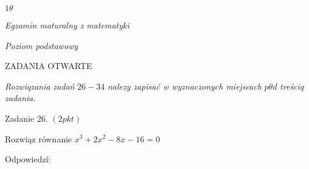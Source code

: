 \documentclass[a4paper,12pt]{article}
\begin{document}
$ 1\theta$

{\it Egzamin maturalny z matematyki}

{\it Poziom podstawowy}

ZADANIA OTWARTE

{\it Rozwiqzania zadań} $26-34$ {\it nalezy zapisać w wyznaczonych miejscach} $p\theta d$ {\it treściq zadania}.

Zadanie 26. $(2pkt)$

Rozwiąz równanie $x^{3}+2x^{2}-8x-16=0$

Odpowiedzí:
\end{document}
